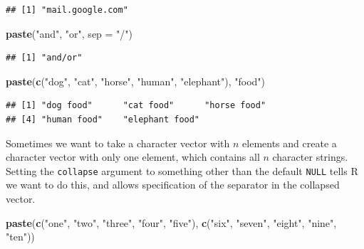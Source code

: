\documentclass[
]{krantz}
\newenvironment{Shaded}{\begin{snugshade}}{\end{snugshade}}
\newcommand{\DataTypeTok}[1]{\textcolor[rgb]{0.13,0.29,0.53}{#1}}
\newcommand{\KeywordTok}[1]{\textcolor[rgb]{0.13,0.29,0.53}{\textbf{#1}}}
\newcommand{\NormalTok}[1]{#1}
\newcommand{\StringTok}[1]{\textcolor[rgb]{0.31,0.60,0.02}{#1}}
\begin{document}
\begin{verbatim}
## [1] "mail.google.com"
\end{verbatim}

\begin{Shaded}
\begin{Highlighting}[]
\KeywordTok{paste}\NormalTok{(}\StringTok{"and"}\NormalTok{, }\StringTok{"or"}\NormalTok{, }\DataTypeTok{sep =} \StringTok{"/"}\NormalTok{)}
\end{Highlighting}
\end{Shaded}

\begin{verbatim}
## [1] "and/or"
\end{verbatim}

\begin{Shaded}
\begin{Highlighting}[]
\KeywordTok{paste}\NormalTok{(}\KeywordTok{c}\NormalTok{(}\StringTok{"dog"}\NormalTok{, }\StringTok{"cat"}\NormalTok{, }\StringTok{"horse"}\NormalTok{, }\StringTok{"human"}\NormalTok{, }\StringTok{"elephant"}\NormalTok{), }\StringTok{"food"}\NormalTok{)}
\end{Highlighting}
\end{Shaded}

\begin{verbatim}
## [1] "dog food"      "cat food"      "horse food"   
## [4] "human food"    "elephant food"
\end{verbatim}

Sometimes we want to take a character vector with \(n\) elements and create a character vector with only one element, which contains all \(n\) character strings. Setting the \texttt{collapse} argument to something other than the default \texttt{NULL} tells R we want to do this, and allows specification of the separator in the collapsed vector.

\begin{Shaded}
\begin{Highlighting}[]
\KeywordTok{paste}\NormalTok{(}\KeywordTok{c}\NormalTok{(}\StringTok{"one"}\NormalTok{, }\StringTok{"two"}\NormalTok{, }\StringTok{"three"}\NormalTok{, }\StringTok{"four"}\NormalTok{, }\StringTok{"five"}\NormalTok{), }
      \KeywordTok{c}\NormalTok{(}\StringTok{"six"}\NormalTok{, }\StringTok{"seven"}\NormalTok{, }\StringTok{"eight"}\NormalTok{, }\StringTok{"nine"}\NormalTok{, }\StringTok{"ten"}\NormalTok{))}
\end{Highlighting}
\end{Shaded}
\end{document}
